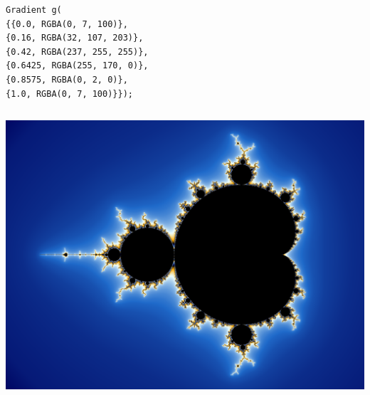 \begin{column}{0.45}
\vskip 0pt
\begin{lstlisting}
Gradient g(
{{0.0, RGBA(0, 7, 100)},
{0.16, RGBA(32, 107, 203)},
{0.42, RGBA(237, 255, 255)},
{0.6425, RGBA(255, 170, 0)},
{0.8575, RGBA(0, 2, 0)},
{1.0, RGBA(0, 7, 100)}});
\end{lstlisting}
\end{column}
\hfill
\begin{column}{0.45}
\vskip 0pt
\centerline{\includegraphics[width=1.1\textwidth]{data/mb.png}}
\end{column}


